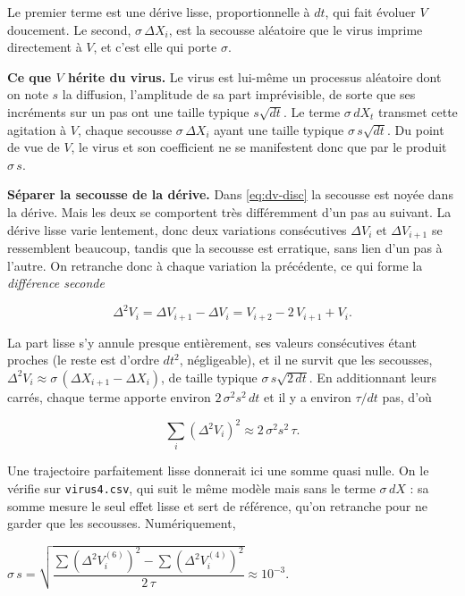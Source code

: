 \documentclass[11pt,a4paper]{article}
\begin{document}
Le premier terme est une dérive lisse, proportionnelle à $dt$, qui fait évoluer $V$ doucement. Le second, $\sigma\,\Delta X_i$, est la secousse aléatoire que le virus imprime directement à $V$, et c'est elle qui porte $\sigma$.

\textbf{Ce que $V$ hérite du virus.} Le virus est lui-même un processus aléatoire dont on note $s$ la diffusion, l'amplitude de sa part imprévisible, de sorte que ses incréments sur un pas ont une taille typique $s\sqrt{dt}$. Le terme $\sigma\,dX_t$ transmet cette agitation à $V$, chaque secousse $\sigma\,\Delta X_i$ ayant une taille typique $\sigma\,s\sqrt{dt}$. Du point de vue de $V$, le virus et son coefficient ne se manifestent donc que par le produit $\sigma\,s$.

\textbf{Séparer la secousse de la dérive.} Dans \eqref{eq:dv-disc} la secousse est noyée dans la dérive. Mais les deux se comportent très différemment d'un pas au suivant. La dérive lisse varie lentement, donc deux variations consécutives $\Delta V_i$ et $\Delta V_{i+1}$ se ressemblent beaucoup, tandis que la secousse est erratique, sans lien d'un pas à l'autre. On retranche donc à chaque variation la précédente, ce qui forme la \emph{différence seconde}

\begin{equation}\label{eq:diff2}
  \Delta^2 V_i = \Delta V_{i+1} - \Delta V_i = V_{i+2} - 2\,V_{i+1} + V_i.
\end{equation}

La part lisse s'y annule presque entièrement, ses valeurs consécutives étant proches (le reste est d'ordre $dt^2$, négligeable), et il ne survit que les secousses, $\Delta^2 V_i \approx \sigma\,(\Delta X_{i+1} - \Delta X_i)$, de taille typique $\sigma\,s\sqrt{2\,dt}$. En additionnant leurs carrés, chaque terme apporte environ $2\,\sigma^2 s^2\,dt$ et il y a environ $\tau/dt$ pas, d'où

\begin{equation}\label{eq:somme2}
  \sum_i (\Delta^2 V_i)^2 \approx 2\,\sigma^2 s^2\,\tau.
\end{equation}

Une trajectoire parfaitement lisse donnerait ici une somme quasi nulle. On le vérifie sur \texttt{virus4.csv}, qui suit le même modèle mais sans le terme $\sigma\,dX$ : sa somme mesure le seul effet lisse et sert de référence, qu'on retranche pour ne garder que les secousses. Numériquement,

\begin{center}
  $\sigma\,s = \sqrt{\dfrac{\sum (\Delta^2 V^{(6)}_i)^2 - \sum (\Delta^2 V^{(4)}_i)^2}{2\,\tau}} \approx 10^{-3}.$
\end{center}
\end{document}
